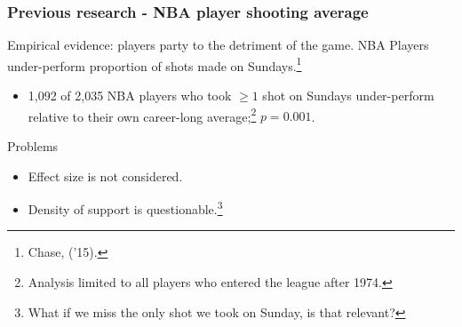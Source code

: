 \documentclass{beamer}
\begin{document}


\begin{frame}
  \frametitle{Previous research - NBA player shooting average}
  \begin{block}{Empirical evidence: players party to the detriment of the game.}
  NBA Players under-perform proportion of shots made on Sundays.\footnote{Chase, ('15).}
  \end{block}
    \begin{itemize}       
    \item 1,092 of 2,035 NBA players who took $\geq 1$ shot on Sundays       under-perform 
      relative to their own career-long average;\footnote{Analysis limited to all players who entered the league after 1974.} $p=0.001$.
    \end{itemize}
    \begin{block}{Problems}       \begin{itemize}           \item Effect size is not considered.
          \item Density of support is questionable.\footnote{What if we miss the only shot we took on Sunday, is that relevant?}            \end{itemize}     \end{block}
\end{frame}
\end{document}
